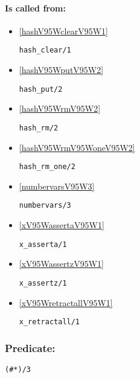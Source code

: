 \paragraph{Is called from:} 
\begin{itemize}
\item \ref{hashV95WclearV95W1} 
\begin{verbatim}
hash_clear/1
\end{verbatim}

\item \ref{hashV95WputV95W2} 
\begin{verbatim}
hash_put/2
\end{verbatim}

\item \ref{hashV95WrmV95W2} 
\begin{verbatim}
hash_rm/2
\end{verbatim}

\item \ref{hashV95WrmV95WoneV95W2} 
\begin{verbatim}
hash_rm_one/2
\end{verbatim}

\item \ref{numbervarsV95W3} 
\begin{verbatim}
numbervars/3
\end{verbatim}

\item \ref{xV95WassertaV95W1} 
\begin{verbatim}
x_asserta/1
\end{verbatim}

\item \ref{xV95WassertzV95W1} 
\begin{verbatim}
x_assertz/1
\end{verbatim}

\item \ref{xV95WretractallV95W1} 
\begin{verbatim}
x_retractall/1
\end{verbatim}

\end{itemize}

\subsubsection{Predicate:} \label{V35WV42WV95W3}

\begin{verbatim}
(#*)/3
\end{verbatim}

